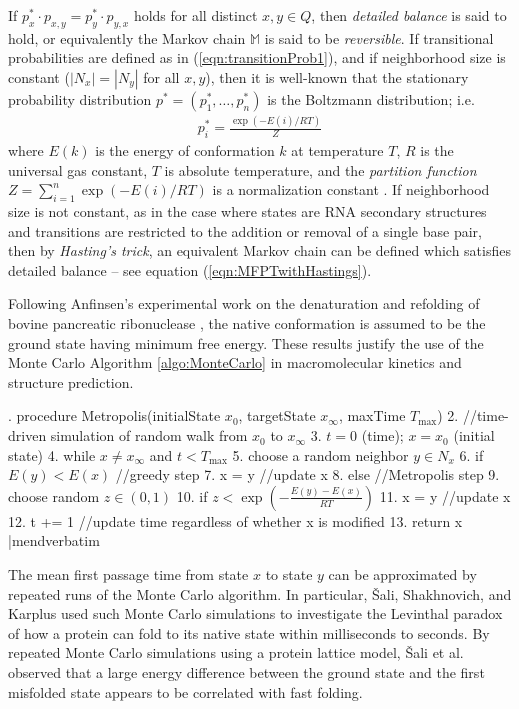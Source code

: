 If $p^*_x \cdot p_{x,y} = p^*_y \cdot p_{y,x}$ holds for all distinct
$x,y \in Q$, then
{\em detailed balance} is said to hold, or equivalently the Markov
chain $\mathbb{M}$ is said to be {\em reversible}.
If transitional probabilities
are defined as in (\ref{eqn:transitionProb1}), and if neighborhood
size is constant ($|N_x|=|N_y|$ for all $x,y$), then it is well-known
that the stationary probability distribution
$p^*=(p^*_1,\ldots,p^*_n)$ is the Boltzmann distribution; i.e.
\begin{eqnarray}
\label{eqn:stationaryBoltzmannProb}
p^*_i = \frac{\exp(-E(i)/RT)}{Z}
\end{eqnarray}
where $E(k)$ is the energy of conformation $k$ at temperature $T$,
$R$ is the universal gas constant,
$T$ is absolute temperature, and the {\em partition function}
$Z = \sum_{i=1}^n \exp(-E(i)/RT)$ is a normalization constant
\cite{waterman:book,cloteBackofen:book}. If neighborhood size is not
constant, as in the case where states are RNA secondary structures and transitions
are restricted to the addition or removal of a single base pair, then
by {\em Hasting's trick}, an equivalent Markov chain can be defined which
satisfies detailed balance -- see equation (\ref{eqn:MFPTwithHastings}).

Following Anfinsen's experimental work on the denaturation and
refolding of bovine pancreatic ribonuclease \cite{anfinsen},
the native conformation is assumed to be the ground state having
minimum free energy. These results justify the use of the Monte Carlo
Algorithm \ref{algo:MonteCarlo} in macromolecular kinetics and
structure prediction.


. procedure Metropolis(initialState $x_0$, targetState $x_{\infty}$, maxTime $T_{\max}$)
 2. //time-driven simulation of random walk from $x_0$ to $x_{\infty}$
 3.   $t=0$ (time); $x=x_0$ (initial state)
 4.   while $x \ne x_{\infty}$ and $t< T_{\max}$
 5.     choose a random neighbor $y \in N_x$
 6.     if $E(y)<E(x)$  //greedy step
 7.       x = y         //update x
 8.     else            //Metropolis step
 9.       choose random $z \in (0,1)$
10.       if $z < \exp\left(-\frac{E(y)-E(x)}{RT}\right)$
11.         x = y      //update x
12.     t += 1  //update time regardless of whether x is modified
13.   return x
|mendverbatim

The mean first passage time from state $x$ to state $y$ can
be approximated by repeated runs of the Monte Carlo algorithm.
In particular, \v{S}ali, Shakhnovich, and Karplus used such Monte Carlo
simulations to investigate the Levinthal paradox of how a protein
can fold to its native state within milliseconds to seconds.
By repeated Monte Carlo simulations using a protein lattice model,
\v{S}ali et al. observed that a large energy difference between
the ground state
and the first misfolded state appears to be correlated with fast folding.

